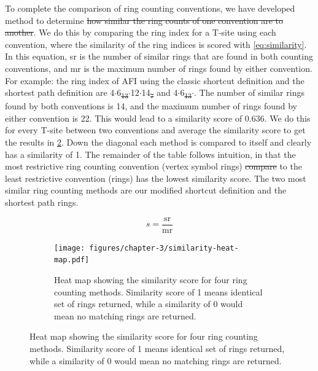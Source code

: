 \documentclass[preprint,numrefs,noinfo,sort&compress]{elsarticle}
\providecommand{\DIFadd}[1]{{\protect\color{blue}\uwave{#1}}} %
\providecommand{\DIFdel}[1]{{\protect\color{red}\sout{#1}}}                      %
\providecommand{\DIFaddbegin}{} %
\providecommand{\DIFaddend}{} %
\providecommand{\DIFdelbegin}{} %
\providecommand{\DIFdelend}{} %
\newcommand{\DIFscaledelfig}{0.5}
\newlength{\DIFdelgraphicswidth} %
\newlength{\DIFdelgraphicsheight} %
\newcommand{\DIFaddincludegraphics}[2][]{{\color{blue}\fbox{\DIFOincludegraphics[#1]{#2}}}} %
\newcommand{\DIFdelincludegraphics}[2][]{%
\sbox{\DIFdelgraphicsbox}{\DIFOincludegraphics[#1]{#2}}%
\settoboxwidth{\DIFdelgraphicswidth}{\DIFdelgraphicsbox} %
\settoboxtotalheight{\DIFdelgraphicsheight}{\DIFdelgraphicsbox} %
\scalebox{\DIFscaledelfig}{%
\parbox[b]{\DIFdelgraphicswidth}{\usebox{\DIFdelgraphicsbox}\\[-\baselineskip] \rule{\DIFdelgraphicswidth}{0em}}\llap{\resizebox{\DIFdelgraphicswidth}{\DIFdelgraphicsheight}{%
\setlength{\unitlength}{\DIFdelgraphicswidth}%
\begin{picture}(1,1)%
\thicklines\linethickness{2pt} %
{\color[rgb]{1,0,0}\put(0,0){\framebox(1,1){}}}%
{\color[rgb]{1,0,0}\put(0,0){\line( 1,1){1}}}%
{\color[rgb]{1,0,0}\put(0,1){\line(1,-1){1}}}%
\end{picture}%
}\hspace*{3pt}}} %
} %
\DeclareRobustCommand{\DIFaddbegin}{\DIFOaddbegin \let\includegraphics\DIFaddincludegraphics} %
\DeclareRobustCommand{\DIFaddend}{\DIFOaddend \let\includegraphics\DIFOincludegraphics} %
\DeclareRobustCommand{\DIFdelbegin}{\DIFOdelbegin \let\includegraphics\DIFdelincludegraphics} %
\DeclareRobustCommand{\DIFdelend}{\DIFOaddend \let\includegraphics\DIFOincludegraphics} %
\begin{document}
To complete the comparison of ring counting conventions, we have developed \DIFaddbegin \DIFadd{a }\DIFaddend method to determine \DIFdelbegin \DIFdel{how similar the ring counts of one convention are to another}\DIFdelend \DIFaddbegin \DIFadd{their similarity}\DIFaddend . We do this by comparing the ring index for a T-site using each convention, where the similarity of the ring indices is scored with \cref{eq:similarity}. In this equation, sr is the number of similar rings that are found in both counting conventions, and mr is the maximum number of rings found by either convention. For example: the ring index of AFI using the classic shortcut definition and the shortest path definition are 4\(\cdot\)6\DIFdelbegin \DIFdel{\textsubscript{13}\(\cdot\)}\DIFdelend \DIFaddbegin \DIFadd{\(_{\text{13}} \cdot\)}\DIFaddend 12\(\cdot\)14\DIFdelbegin \DIFdel{\textsubscript{7} }\DIFdelend \DIFaddbegin \DIFadd{\(_{\text{7}}\) }\DIFaddend and 4\(\cdot\)6\DIFdelbegin \DIFdel{\textsubscript{13}\(\cdot\)}\DIFdelend \DIFaddbegin \DIFadd{\(_{\text{13}} \cdot\)}\DIFaddend . The number of similar rings found by both conventions is 14, and the maximum number of rings found by either convention is 22. This would lead to a similarity score of 0.636. We do this for every T-site between two conventions and average the similarity score to get the results in \cref{fig:similarity}. Down the diagonal each method is compared to itself and clearly has a similarity of 1. The remainder of the table follows intuition, in that the  most restrictive ring counting convention (vertex symbol rings) \DIFdelbegin \DIFdel{compare }\DIFdelend \DIFaddbegin \DIFadd{compared }\DIFaddend to the least restrictive convention (rings) has the lowest similarity score. The two most similar ring counting methods are our modified shortcut definition and the shortest path rings. 

\begin{equation}\label{eq:similarity}
s = \mathrm{ \frac{sr}{mr} }
\end{equation}

\begin{figure}
\begin{figure}[H]
\centering
\texttt{[image: figures/chapter-3/similarity-heat-map.pdf]}
\caption{Heat map showing the similarity score for four ring counting methods. Similarity score of 1 means identical set of rings returned, while a similarity of 0 would mean no matching rings are returned. \label{fig:similarity}}
\end{figure}
\end{figure}
\end{document}
